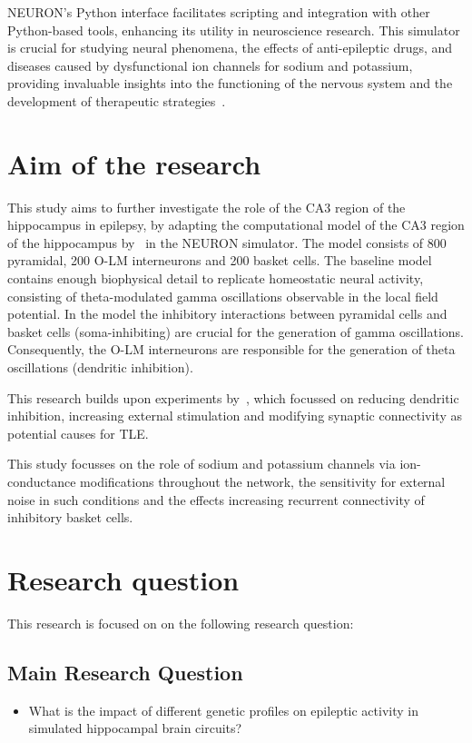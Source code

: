 NEURON's Python interface facilitates scripting and integration
with other Python-based tools, enhancing its utility in neuroscience research.
This simulator is crucial for studying neural phenomena, the effects of
anti-epileptic drugs, and diseases caused by dysfunctional ion channels for sodium and potassium,
providing invaluable insights into the functioning of the nervous system
and the development of therapeutic strategies~\parencite{miglioreParallelNetworkSimulations2006}.
\pagebreak
\section{Aim of the research}
This study aims to further investigate the role of the CA3 region of the hippocampus in epilepsy,
by adapting the computational model of the CA3 region of the hippocampus by~\textcite{neymotinKetamineDisruptsTheta2011} in the NEURON simulator.
The model consists of 800 pyramidal, 200 O-LM interneurons and 200 basket cells.
The baseline model contains enough biophysical detail to replicate homeostatic neural activity, consisting of theta-modulated gamma oscillations observable in the local field potential.
In the model the inhibitory interactions between pyramidal cells and basket cells (soma-inhibiting) are crucial for the generation of gamma oscillations.
Consequently, the O-LM interneurons are responsible for the generation of theta oscillations (dendritic inhibition).

This research builds upon experiments by~\textcite{sanjayImpairedDendriticInhibition2015},
which focussed on reducing dendritic inhibition, increasing external stimulation and modifying synaptic connectivity as potential causes for TLE\@.

This study focusses on the role of sodium and potassium channels via ion-conductance modifications throughout the network,
the sensitivity for external noise in such conditions and the effects increasing recurrent connectivity of inhibitory basket cells.
\pagebreak
\section{Research question}
This research is focused on on the following research question:

\subsection*{Main Research Question}

\begin{itemize}
    \item What is the impact of different genetic profiles on epileptic activity in simulated hippocampal brain circuits?
\end{itemize}

